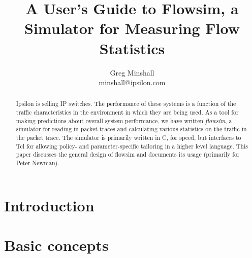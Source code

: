 \documentclass{article}
\begin{document}
\newcommand{\NAME}{\item[NAME]}
\newcommand{\SYNOPSIS}{\item[SYNOPSIS]}
\newcommand{\DESCRIPTION}{\item[DESCRIPTION]}
\newcommand{\KEYWORDS}{\item[KEYWORDS]}
\newcommand{\SEEALSO}{\item[SEE ALSO]}
\newcommand{\BUGS}{\item[BUGS]}

\newcommand{\man}[2]{\newpage\subsection{#1}\renewcommand{\cmdname}{\cmd{#1}}\begin{description}\NAME #1 --- #2}
\newcommand{\manend}{\end{description}}
\newcommand{\cmd}[1]{\textbf{#1}}
\newcommand{\cmdarg}[1]{\textit{#1}}
\newcommand{\cmdname}{WHERE IS THE COMMAND NAME?}

\title{A User's Guide to Flowsim, a Simulator for Measuring Flow Statistics}

\author{Greg Minshall \\ minshall@ipsilon.com}

\maketitle

\begin{abstract}
Ipsilon is selling IP switches.  The performance of these systems is a
function of the traffic characteristics in the environment in which
they are being used.  As a tool for making predictions about overall
system performance, we have written \emph{flowsim}, a simulator for
reading in packet traces and calculating various statistics on the
traffic in the packet trace.  The simulator is primarily written in C,
for speed, but interfaces to Tcl for allowing policy- and
parameter-specific tailoring in a higher level language.
This paper discusses the general design of flowsim and documents its
usage (primarily for Peter Newman).
\end{abstract}

\section{Introduction}

\section{Basic concepts}
\end{document}
